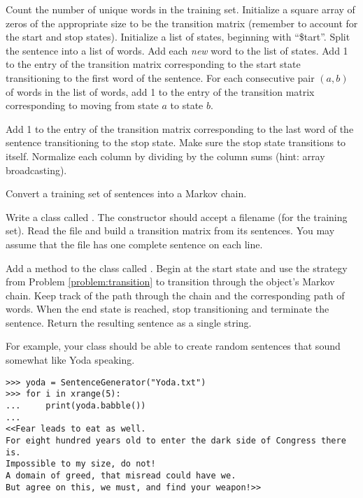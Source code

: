 \begin{algorithm} %
\begin{algorithmic}[1]
\State Count the number of unique words in the training set.
\State Initialize a square array of zeros of the appropriate size to be the transition matrix (remember to account for the start and stop states).
\State Initialize a list of states, beginning with ``\$tart''.
    \State Split the sentence into a list of words.
    \State Add each \emph{new} word to the list of states.
    \State Add 1 to the entry of the transition matrix corresponding to the start state transitioning to the first word of the sentence.
   	\State For each consecutive pair $(a, b)$ of words in the list of words, add 1 to the entry of the transition matrix corresponding to moving from state $a$ to state $b$.
	\item Add 1 to the entry of the transition matrix corresponding to the last word of the sentence transitioning to the stop state.
\EndFor
\State Make sure the stop state transitions to itself.
\State Normalize each column by dividing by the column sums (hint: array broadcasting).
\EndProcedure
\end{algorithmic}
\caption{Convert a training set of sentences into a Markov chain.}
\label{alg:MarkovSentencesTransitionMatrix}
\end{algorithm}

\begin{problem} %
Write a class called .
The constructor should accept a filename (for the training set).
Read the file and build a transition matrix from its sentences.
You may assume that the file has one complete sentence on each line.
\label{problem:MarkovClassPt1}
\end{problem}

\begin{problem} %
Add a method to the  class called .
Begin at the start state and use the strategy from Problem \ref{problem:transition} to transition through the object's Markov chain.
Keep track of the path through the chain and the corresponding path of words.
When the end state is reached, stop transitioning and terminate the sentence.
Return the resulting sentence as a single string.

For example, your  class should be able to create random sentences that sound somewhat like Yoda speaking.
\begin{lstlisting}
>>> yoda = SentenceGenerator("Yoda.txt")
>>> for i in xrange(5):
... 	print(yoda.babble())
...
<<Fear leads to eat as well.
For eight hundred years old to enter the dark side of Congress there is.
Impossible to my size, do not!
A domain of greed, that misread could have we.
But agree on this, we must, and find your weapon!>>
\end{lstlisting}
\end{problem}

